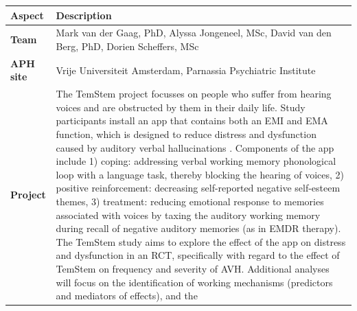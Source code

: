 \documentclass[]{book}
\begin{document}
\begin{longtable}[]{@{}ll@{}}
\toprule
\begin{minipage}[b]{0.25\columnwidth}\raggedright\strut
\textbf{Aspect}\strut
\end{minipage} & \begin{minipage}[b]{0.69\columnwidth}\raggedright\strut
\textbf{Description}\strut
\end{minipage}\tabularnewline
\midrule
\endhead
\begin{minipage}[t]{0.25\columnwidth}\raggedright\strut
\textbf{Team}\strut
\end{minipage} & \begin{minipage}[t]{0.69\columnwidth}\raggedright\strut
Mark van der Gaag, PhD, Alyssa Jongeneel, MSc, David van den Berg, PhD,
Dorien Scheffers, MSc\strut
\end{minipage}\tabularnewline
\begin{minipage}[t]{0.25\columnwidth}\raggedright\strut
\textbf{APH site}\strut
\end{minipage} & \begin{minipage}[t]{0.69\columnwidth}\raggedright\strut
Vrije Universiteit Amsterdam, Parnassia Psychiatric Institute\strut
\end{minipage}\tabularnewline
\begin{minipage}[t]{0.25\columnwidth}\raggedright\strut
\textbf{Project}\strut
\end{minipage} & \begin{minipage}[t]{0.69\columnwidth}\raggedright\strut
The TemStem project focusses on people who suffer from hearing voices
and are obstructed by them in their daily life. Study participants
install an app that contains both an EMI and EMA function, which is
designed to reduce distress and dysfunction caused by auditory verbal
hallucinations \citep{jongeneel2018}. Components of the app include 1)
coping: addressing verbal working memory phonological loop with a
language task, thereby blocking the hearing of voices, 2) positive
reinforcement: decreasing self-reported negative self-esteem themes, 3)
treatment: reducing emotional response to memories associated with
voices by taxing the auditory working memory during recall of negative
auditory memories (as in EMDR therapy). The TemStem study aims to
explore the effect of the app on distress and dysfunction in an RCT,
specifically with regard to the effect of TemStem on frequency and
severity of AVH. Additional analyses will focus on the identification of
working mechanisms (predictors and mediators of effects), and the

\end{minipage}
\end{longtable}
\end{document}
